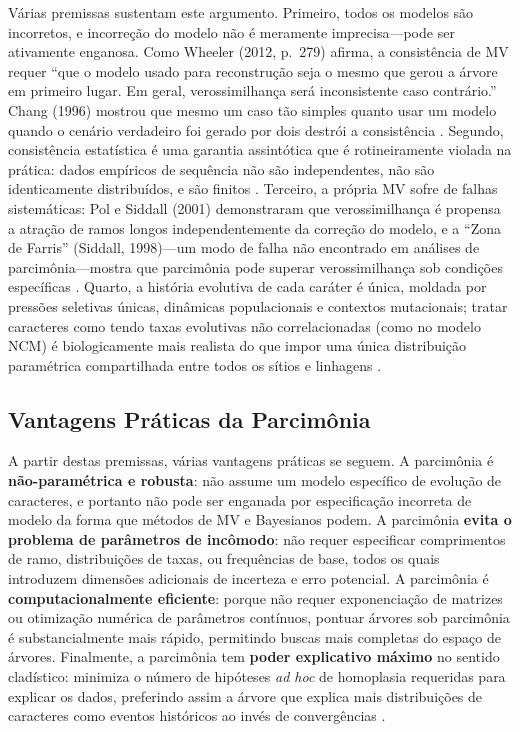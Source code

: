 Várias premissas sustentam este argumento. Primeiro, todos os modelos são incorretos, e incorreção do modelo não é meramente imprecisa---pode ser ativamente enganosa. Como Wheeler (2012, p.~279) afirma, a consistência de MV requer ``que o modelo usado para reconstrução seja o mesmo que gerou a árvore em primeiro lugar. Em geral, verossimilhança será inconsistente caso contrário.'' Chang (1996) mostrou que mesmo um caso tão simples quanto usar um modelo quando o cenário verdadeiro foi gerado por dois destrói a consistência \parencite{chang1996}. Segundo, consistência estatística é uma garantia assintótica que é rotineiramente violada na prática: dados empíricos de sequência não são independentes, não são identicamente distribuídos, e são finitos \parencite{wheeler2012}. Terceiro, a própria MV sofre de falhas sistemáticas: Pol e Siddall (2001) demonstraram que verossimilhança é propensa a atração de ramos longos independentemente da correção do modelo, e a ``Zona de Farris'' (Siddall, 1998)---um modo de falha não encontrado em análises de parcimônia---mostra que parcimônia pode superar verossimilhança sob condições específicas \parencite{pol2001,siddall1998}. Quarto, a história evolutiva de cada caráter é única, moldada por pressões seletivas únicas, dinâmicas populacionais e contextos mutacionais; tratar caracteres como tendo taxas evolutivas não correlacionadas (como no modelo NCM) é biologicamente mais realista do que impor uma única distribuição paramétrica compartilhada entre todos os sítios e linhagens \parencite{tuffley1997}.

\subsection{Vantagens Práticas da Parcimônia}

A partir destas premissas, várias vantagens práticas se seguem. A parcimônia é \textbf{não-paramétrica e robusta}: não assume um modelo específico de evolução de caracteres, e portanto não pode ser enganada por especificação incorreta de modelo da forma que métodos de MV e Bayesianos podem. A parcimônia \textbf{evita o problema de parâmetros de incômodo}: não requer especificar comprimentos de ramo, distribuições de taxas, ou frequências de base, todos os quais introduzem dimensões adicionais de incerteza e erro potencial. A parcimônia é \textbf{computacionalmente eficiente}: porque não requer exponenciação de matrizes ou otimização numérica de parâmetros contínuos, pontuar árvores sob parcimônia é substancialmente mais rápido, permitindo buscas mais completas do espaço de árvores. Finalmente, a parcimônia tem \textbf{poder explicativo máximo} no sentido cladístico: minimiza o número de hipóteses \textit{ad hoc} de homoplasia requeridas para explicar os dados, preferindo assim a árvore que explica mais distribuições de caracteres como eventos históricos ao invés de convergências \parencite{farris1983}.

